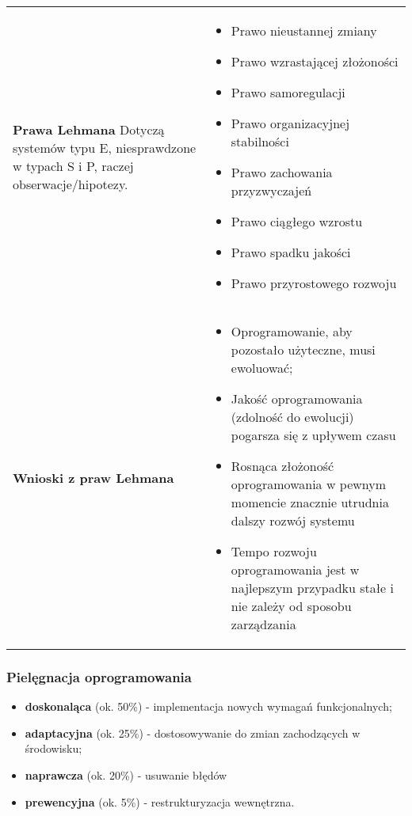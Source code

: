 \documentclass[a4paper]{article}
\begin{document}
    \begin{table}[H]
        \begin{center}
            \begin{tabular}{ p{3cm} p{13cm}}
                \textbf{Prawa Lehmana}
                Dotyczą systemów typu E, niesprawdzone w typach S i P, raczej obserwacje/hipotezy.
                &
                \begin{itemize}
                    \item Prawo nieustannej zmiany
                    \item Prawo wzrastającej złożoności
                    \item Prawo samoregulacji
                    \item Prawo organizacyjnej stabilności
                    \item Prawo zachowania przyzwyczajeń
                    \item Prawo ciągłego wzrostu
                    \item Prawo spadku jakości
                    \item Prawo przyrostowego rozwoju
                \end{itemize}
                \\

                \textbf{Wnioski z praw Lehmana}
                &
                \begin{itemize}
                    \item Oprogramowanie, aby pozostało użyteczne, musi ewoluować;
                    \item Jakość oprogramowania (zdolność do ewolucji) pogarsza się z upływem czasu
                    \item Rosnąca złożoność oprogramowania w pewnym momencie znacznie utrudnia dalszy rozwój systemu
                    \item Tempo rozwoju oprogramowania jest w najlepszym przypadku stałe i nie zależy od
                    sposobu zarządzania
                \end{itemize}

            \end{tabular}
        \end{center}
    \end{table}

    \subsubsection{Pielęgnacja oprogramowania}
    \begin{itemize}
        \item \textbf{doskonaląca} (ok. 50\%) - implementacja nowych wymagań
        funkcjonalnych;
        \item \textbf{adaptacyjna} (ok. 25\%) - dostosowywanie do zmian zachodzących w środowisku;
        \item \textbf{naprawcza} (ok. 20\%) - usuwanie błędów
        \item \textbf{prewencyjna} (ok. 5\%) - restrukturyzacja wewnętrzna.
    \end{itemize}
\end{document}
